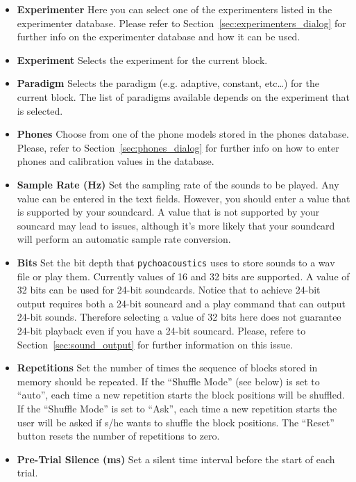 \begin{itemize}
\item \textbf{Experimenter} Here you can select one of the experimenters listed in the
experimenter database. Please refer to Section~\ref{sec:experimenters_dialog} for further info on the experimenter
database and how it can be used. 
\item \textbf{Experiment} Selects the experiment for the current block.
\item \textbf{Paradigm} Selects the paradigm (e.g. adaptive, constant, etc\ldots) 
for the current block. The list of paradigms available depends on the experiment
that is selected. 
\item \textbf{Phones} Choose from one of the phone models stored in the phones database.
Please, refer to Section~\ref{sec:phones_dialog} for further info on how to enter phones and calibration values
in the database.
\item \textbf{Sample Rate (Hz)} Set the sampling rate of the sounds to be played. Any value
can be entered in the text fields. However, you should enter a value that is supported 
by your soundcard. A value that is not supported by your souncard may lead to issues,
although it's more likely that your soundcard will perform an automatic sample rate
conversion.
\item \textbf{Bits} Set the bit depth that \texttt{pychoacoustics} uses to store sounds 
to a wav file or play them. Currently values of 16 and 32 bits are supported. 
A value of 32 bits can be used for 24-bit soundcards. Notice that to achieve 24-bit output 
requires both a 24-bit souncard and a play command that can output 24-bit sounds. Therefore 
selecting a value of 32 bits here does not guarantee 24-bit playback even if you have a 24-bit souncard. 
Please, refere to Section~\ref{sec:sound_output} for further information on this issue.

\item \textbf{Repetitions} Set the number of times the sequence of blocks stored in memory should be repeated. If the ``Shuffle Mode'' (see below) is 
set to ``auto'', each time a new repetition starts the block positions will be shuffled. If the ``Shuffle Mode'' is set to ``Ask'', each time a new
repetition starts the user will be asked if s/he wants to shuffle the block positions. The ``Reset'' button resets the number of repetitions to zero.

\item \textbf{Pre-Trial Silence (ms)} Set a silent time interval before the start of each trial. 


\end{itemize}
